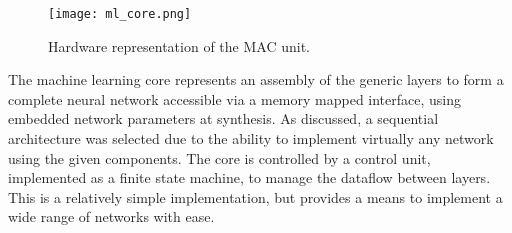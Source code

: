 \begin{figure}[h]
    \centering
    \texttt{[image: ml\_core.png]}
    \caption{Hardware representation of the MAC unit.}
    \label{fig:ml_core}
\end{figure}

The machine learning core represents an assembly of the generic layers to form a complete neural network accessible via a memory mapped interface, using embedded network parameters at synthesis.
As discussed, a sequential architecture was selected due to the ability to implement virtually any network using the given components.
The core is controlled by a control unit, implemented as a finite state machine, to manage the dataflow between layers.
This is a relatively simple implementation, but provides a means to implement a wide range of networks with ease.
